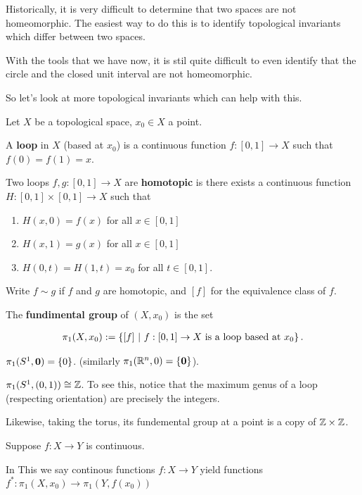 \documentclass[12pt, twosided]{article}
\begin{document}
Historically, it is very difficult to determine that two spaces are not homeomorphic. The easiest way to do this is to identify topological invariants which differ between two spaces.

With the tools that we have now, it is stil quite difficult to even identify that the circle and the closed unit interval are not homeomorphic.

So let's look at more topological invariants which can help with this.

\begin{df}
  Let \(X\) be a topological space, \(x_0 \in X\) a point.

  A \textbf{loop} in \(X\) (based at \(x_0\)) is a continuous function \(f:[0,1]  \to X\) such that \(f(0) = f(1) = x\).
\end{df}

\begin{df}
  Two loops \(f,g: [0,1] \to X\) are \textbf{homotopic} is there exists a continuous function \(H: [0,1] \times [0,1] \to X\) such that

  \begin{enumerate}
  \item \(H(x, 0) = f(x)\) for all \(x \in [0, 1]\)
  \item \(H(x, 1) = g(x)\) for all \(x \in [0, 1]\)
  \item \(H(0, t) = H(1, t)= x_0\) for all \(t \in [0,1]\).
  \end{enumerate}
\end{df}

Write \(f \sim g\) if \(f\) and \(g\) are homotopic, and \([f]\) for the equivalence class of \(f\).

\begin{df}
  The \textbf{fundimental group} of \((X, x_0)\) is the set

  \begin{align*}
    \pi_1(X, x_0) := \left\{ [f] \ \middle\vert\  f:[0,1] \to X \text{ is a loop based at } x_0 \right\}.
  \end{align*}
\end{df}

\begin{exa}
  \(\pi_1(S^1,\mathbf{0}) = \left\{ 0 \right\}\). (similarly \(\pi_1(\mathbb{R}^n, 0) = \left\{ \mathbf{0} \right\}\)).

  \(\pi_1(S^1, (0, 1)) \cong \mathbb{Z}\). To see this, notice that the maximum genus of a loop (respecting orientation) are precisely the integers.

  Likewise, taking the torus, its fundemental group at a point is a copy of \(\mathbb{Z} \times \mathbb{Z}\).
\end{exa}
\pagebreak
Suppose \(f: X \to Y\) is continuous.

\begin{center}
\end{center}

In This we say continous functions \(f:X \to Y\) yield functions \(f^*: \pi_1(X, x_0) \to \pi_1(Y, f(x_0))\)
\end{document}
